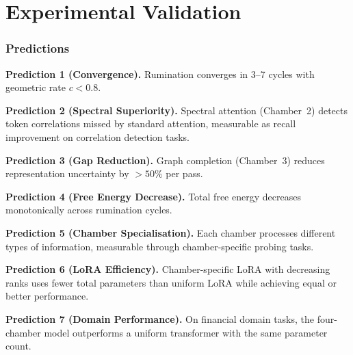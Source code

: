 \documentclass[twocolumn,10pt]{article}
\theoremstyle{remark}
\begin{document}
\part{Experimental Validation}

\section{Predictions}
\label{sec:predictions}

\textbf{Prediction 1 (Convergence).}  Rumination converges in 3--7 cycles with geometric rate $c < 0.8$.

\textbf{Prediction 2 (Spectral Superiority).}  Spectral attention (Chamber~2) detects token correlations missed by standard attention, measurable as recall improvement on correlation detection tasks.

\textbf{Prediction 3 (Gap Reduction).}  Graph completion (Chamber~3) reduces representation uncertainty by $>50\%$ per pass.

\textbf{Prediction 4 (Free Energy Decrease).}  Total free energy decreases monotonically across rumination cycles.

\textbf{Prediction 5 (Chamber Specialisation).}  Each chamber processes different types of information, measurable through chamber-specific probing tasks.

\textbf{Prediction 6 (LoRA Efficiency).}  Chamber-specific LoRA with decreasing ranks uses fewer total parameters than uniform LoRA while achieving equal or better performance.

\textbf{Prediction 7 (Domain Performance).}  On financial domain tasks, the four-chamber model outperforms a uniform transformer with the same parameter count.
\end{document}
